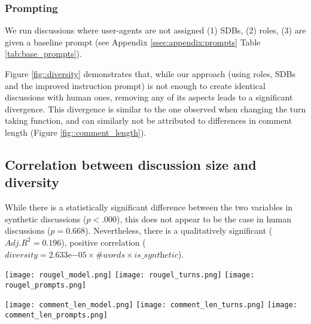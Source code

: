 \subsubsection{Prompting}

We run discussions where user-agents are not assigned (1) \acp{SDB}, (2) roles, (3) are given a baseline prompt (see Appendix \ref{ssec:appendix:prompts} Table \ref{tab:base_prompts}).

Figure \ref{fig::diversity} demonstrates that, while our approach (using roles, \acp{SDB} and the improved instruction prompt) is not enough to create identical discussions with human ones, removing any of its aspects leads to a significant divergence. This divergence is similar to the one observed when changing the turn taking function, and can similarly not be attributed to differences in comment length (Figure \ref{fig::comment_length}).


\subsection{Correlation between discussion size and diversity}
\label{ssec:results:corr}

While there is a statistically significant difference between the two variables in synthetic discussions ($p<.000$), this does not appear to be the case in human discussions ($p=0.668$). Nevertheless, there is a qualitatively significant  ($Adj. R^2=0.196$), positive correlation ($\textit{diversity} = 2.633\mathrm{e}{-05} \times \textit{\#words} \times \textit{is\_synthetic}$).

\begin{figure*}[t]
    \texttt{[image: rougel\_model.png]} \hfill
    \texttt{[image: rougel\_turns.png]}
    \hfill
    \texttt{[image: rougel\_prompts.png]}
	\centering
	\caption{Diversity (Section \ref{ssec:methodology:diversity}) distribution for each discussion by model (Section \ref{ssec:experimental:model}), turn-taking function $u$ (Section \ref{ssec:experimental:turn}), and prompting function $\phi$ used (Section \ref{ssec:experimental:prompts}).}
	\label{fig::diversity}
\end{figure*}

\begin{figure*}[t]
    \texttt{[image: comment\_len\_model.png]} \hfill
    \texttt{[image: comment\_len\_turns.png]}
    \hfill
    \texttt{[image: comment\_len\_prompts.png]}
	\centering
	\caption{Comment length for each discussion by model (Section \ref{ssec:experimental:model}), turn-taking function $u$ (Section \ref{ssec:experimental:turn}), and prompting function $\phi$ used (Section \ref{ssec:experimental:prompts}). For ease of comparison, comments above $400$ words are marked at the end of the x-axis.}
	\label{fig::comment_length}
\end{figure*}



